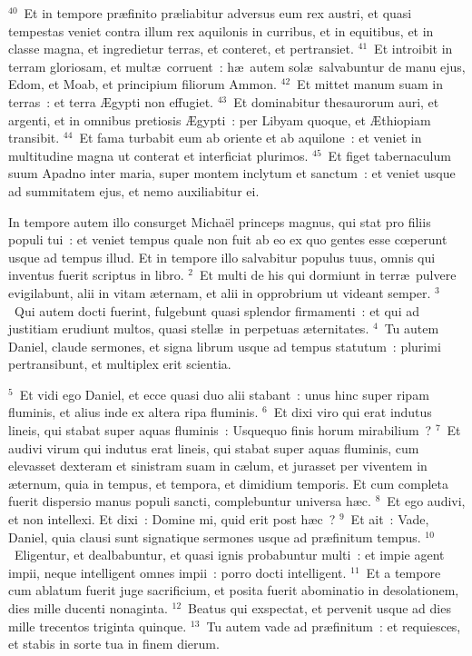 ${}^{40}$~Et in tempore pr\ae finito pr\ae liabitur adversus eum rex austri, et quasi tempestas veniet contra illum rex aquilonis in curribus, et in equitibus, et in classe magna, et ingredietur terras, et conteret, et pertransiet.
${}^{41}$~Et introibit in terram gloriosam, et mult\ae\ corruent~: h\ae\ autem sol\ae\ salvabuntur de manu ejus, Edom, et Moab, et principium filiorum Ammon.
${}^{42}$~Et mittet manum suam in terras~: et terra \AE gypti non effugiet.
${}^{43}$~Et dominabitur thesaurorum auri, et argenti, et in omnibus pretiosis \AE gypti~: per Libyam quoque, et \AE thiopiam transibit.
${}^{44}$~Et fama turbabit eum ab oriente et ab aquilone~: et veniet in multitudine magna ut conterat et interficiat plurimos.
${}^{45}$~Et figet tabernaculum suum Apadno inter maria, super montem inclytum et sanctum~: et veniet usque ad summitatem ejus, et nemo auxiliabitur ei.

\lettrine[lines=10,image=true,loversize=0.05,lraise=-0.03]{I}{}n tempore autem illo consurget Micha\"el princeps magnus, qui stat pro filiis populi tui~: et veniet tempus quale non fuit ab eo ex quo gentes esse cœperunt usque ad tempus illud. Et in tempore illo salvabitur populus tuus, omnis qui inventus fuerit scriptus in libro.
${}^{2}$~Et multi de his qui dormiunt in terr\ae\ pulvere evigilabunt, alii in vitam \ae ternam, et alii in opprobrium ut videant semper.
${}^{3}$~Qui autem docti fuerint, fulgebunt quasi splendor firmamenti~: et qui ad justitiam erudiunt multos, quasi stell\ae\ in perpetuas \ae ternitates.
${}^{4}$~Tu autem Daniel, claude sermones, et signa librum usque ad tempus statutum~: plurimi pertransibunt, et multiplex erit scientia.


${}^{5}$~Et vidi ego Daniel, et ecce quasi duo alii stabant~: unus hinc super ripam fluminis, et alius inde ex altera ripa fluminis.
${}^{6}$~Et dixi viro qui erat indutus lineis, qui stabat super aquas fluminis~: Usquequo finis horum mirabilium~?
${}^{7}$~Et audivi virum qui indutus erat lineis, qui stabat super aquas fluminis, cum elevasset dexteram et sinistram suam in c\ae lum, et jurasset per viventem in \ae ternum, quia in tempus, et tempora, et dimidium temporis. Et cum completa fuerit dispersio manus populi sancti, complebuntur universa h\ae c.
${}^{8}$~Et ego audivi, et non intellexi. Et dixi~: Domine mi, quid erit post h\ae c~?
${}^{9}$~Et ait~: Vade, Daniel, quia clausi sunt signatique sermones usque ad pr\ae finitum tempus.
${}^{10}$~Eligentur, et dealbabuntur, et quasi ignis probabuntur multi~: et impie agent impii, neque intelligent omnes impii~: porro docti intelligent.
${}^{11}$~Et a tempore cum ablatum fuerit juge sacrificium, et posita fuerit abominatio in desolationem, dies mille ducenti nonaginta.
${}^{12}$~Beatus qui exspectat, et pervenit usque ad dies mille trecentos triginta quinque.
${}^{13}$~Tu autem vade ad pr\ae finitum~: et requiesces, et stabis in sorte tua in finem dierum.

